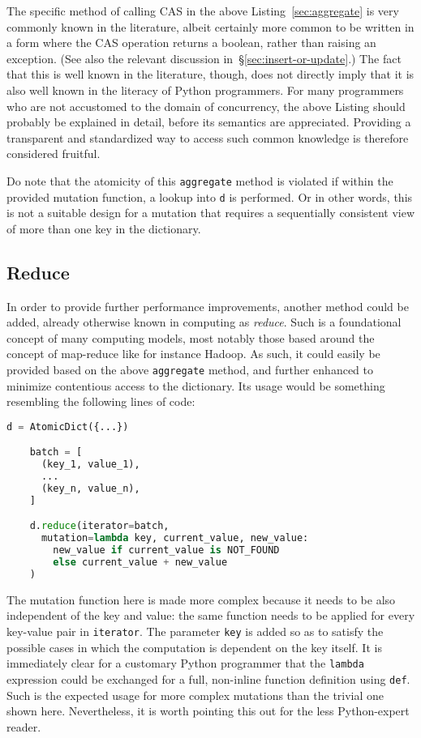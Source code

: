 The specific method of calling CAS in the above Listing~\ref{sec:aggregate} is very commonly known in the literature, albeit certainly more common to be written in a form where the CAS operation returns a boolean, rather than raising an exception.
(See also the relevant discussion in~\S\ref{sec:insert-or-update}.)
The fact that this is well known in the literature, though, does not directly imply that it is also well known in the literacy of Python programmers.
For many programmers who are not accustomed to the domain of concurrency, the above Listing should probably be explained in detail, before its semantics are appreciated.
Providing a transparent and standardized way to access such common knowledge is therefore considered fruitful.

Do note that the atomicity of this \texttt{aggregate} method is violated if within the provided mutation function, a lookup into \texttt{d} is performed.
Or in other words, this is not a suitable design for a mutation that requires a sequentially consistent view of more than one key in the dictionary.

\subsection{Reduce}\label{subsec:reduce}

In order to provide further performance improvements, another method could be added, already otherwise known in computing as \emph{reduce}.
Such is a foundational concept of many computing models, most notably those based around the concept of map-reduce like for instance Hadoop.
As such, it could easily be provided based on the above \texttt{aggregate} method, and further enhanced to minimize contentious access to the dictionary.
Its usage would be something resembling the following lines of code:
\begin{lstlisting}[label={lst:reduce-usage}, language=Python]
	d = AtomicDict({...})

	batch = [
	  (key_1, value_1),
	  ...
	  (key_n, value_n),
	]

	d.reduce(iterator=batch,
	  mutation=lambda key, current_value, new_value:
	    new_value if current_value is NOT_FOUND
	    else current_value + new_value
	)
\end{lstlisting}

The mutation function here is made more complex because it needs to be also independent of the key and value: the same function needs to be applied for every key-value pair in \texttt{iterator}.
The parameter \texttt{key} is added so as to satisfy the possible cases in which the computation is dependent on the key itself.
It is immediately clear for a customary Python programmer that the \texttt{lambda} expression could be exchanged for a full, non-inline function definition using \texttt{def}.
Such is the expected usage for more complex mutations than the trivial one shown here.
Nevertheless, it is worth pointing this out for the less Python-expert reader.

